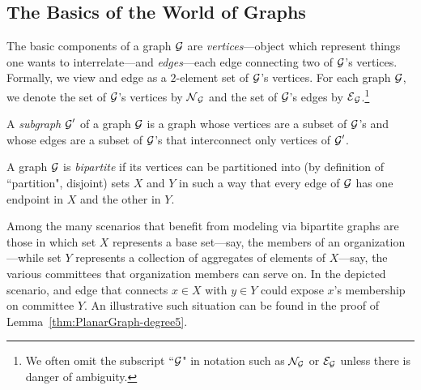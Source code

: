 \subsection{The Basics of the World of Graphs}

The basic components of a graph $\mbox{$\cal G$}$ are {\it vertices}---object which represent things one wants to interrelate---and {\it edges}---each edge connecting two of $\mbox{$\cal G$}$'s vertices.  Formally, we view and edge as a $2$-element set of $\mbox{$\cal G$}$'s vertices.  For each graph $\mbox{$\cal G$}$, we denote the set of $\mbox{$\cal G$}$'s vertices by $\mbox{$\cal N$}_{\mbox{{\scriptsize $\cal G$}}}$ and the set of $\mbox{$\cal G$}$'s edges by $\mbox{$\cal E$}_{\mbox{{\scriptsize $\cal G$}}}$.\footnote{We often omit the subscript ``$\mbox{$\cal G$}$" in notation such as ${\cal N}_{\cal G}$ or ${\cal E}_{\cal G}$ unless there is danger of ambiguity.}

\bigskip

\noindent {}

\bigskip

\noindent
A {\it subgraph} $\mbox{$\cal G$}'$ of a graph $\mbox{$\cal G$}$ is a graph whose vertices are a subset of $\mbox{$\cal G$}$'s and whose edges are a subset of $\mbox{$\cal G$}$'s that interconnect only vertices of $\mbox{$\cal G$}'$.

\medskip

A graph $\mbox{$\cal G$}$ is {\em bipartite} if its vertices can be partitioned into (by definition of ``partition", disjoint) sets $X$ and $Y$ in such a way that every edge of $\mbox{$\cal G$}$ has one endpoint in $X$ and the other in $Y$.

\smallskip

Among the many scenarios that benefit from modeling via bipartite graphs are those in which set $X$ represents a base set---say, the members of an organization---while set $Y$ represents a collection of aggregates of elements of $X$---say, the various committees that organization members can serve on.  In the depicted scenario, and edge that connects $x \in X$ with $y \in Y$ could expose $x$'s membership on committee $Y$.  An illustrative such situation can be found in the proof of Lemma~\ref{thm:PlanarGraph-degree5}.

